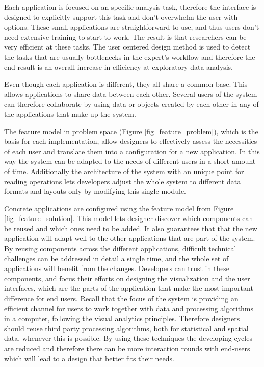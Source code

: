 Each application is focused on an specific analysis task, therefore the interface is designed to explicitly support this task and don't overwhelm the user with options. These small applications are straightforward to use, and thus users don't need extensive training to start to work. The result is that researchers can be very efficient at these tasks. The user centered design method is used to detect the tasks that are usually bottlenecks in the expert's workflow and therefore the end result is an overall increase in efficiency at exploratory data analysis. 

Even though each application is different, they all share a common base. This allows applications to share data between each other. Several users of the system can therefore collaborate by using data or objects created by each other in any of the applications that make up the system. 

The feature model in problem space (Figure \ref{fig_feature_problem}), which is the basis for each implementation, allow designers to effectively assess the necessities of each user and translate them into a configuration for a new application. In this way the system can be adapted to the needs of different users in a short amount of time. Additionally the architecture of the system with an unique point for reading operations lets developers adjust the whole system to different data formats and layouts only by modifying this single module. 

Concrete applications are configured using the feature model from Figure \ref{fig_feature_solution}. This model lets designer discover which components can be reused and which ones need to be added. It also guarantees that that the new application will adapt well to the other applications that are part of the system. By reusing components across the different applications, difficult technical challenges can be addressed in detail a single time, and the whole set of applications will benefit from the changes. Developers can trust in these components, and focus their efforts on designing the visualization and the user interfaces, which are the parts of the application that make the most important difference for end users. Recall that the focus of the system is providing an efficient channel for users to work together with data and processing algorithms in a computer, following the visual analytics principles. Therefore designers should reuse third party processing algorithms, both for statistical and spatial data, whenever this is possible. By using these techniques the developing cycles are reduced and therefore there can be more interaction rounds with end-users which will lead to a design that better fits their needs.

